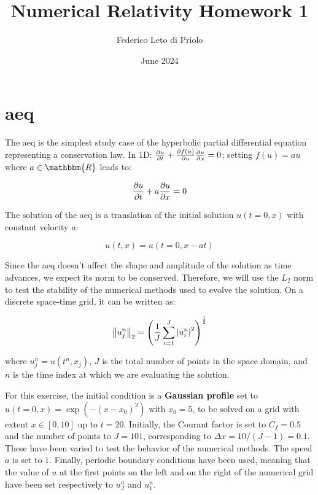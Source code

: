 \documentclass[11pt, a4paper]{article}
\title{Numerical Relativity Homework 1}
\author{Federico Leto di Priolo}
\date{June 2024}
\begin{document}
\maketitle

\section{\acrfull{aeq}}

The \acrshort{aeq} is the simplest study case of the hyperbolic partial differential equation representing a conservation law. In 1D: \(\pdv{u}{t} + \pdv{f(u)}{u} \pdv{u}{x} = 0\); setting \(f(u) = au\) where \(a \in \mathbbm{R}\) leads to:

\begin{equation} \label{eq:adv_eq}
    \pdv{u}{t} + a \pdv{u}{x} = 0
\end{equation}

\noindent
The solution of the \acrshort{aeq} is a translation of the initial solution \(u(t = 0, x)\) with constant velocity \(a\):

\begin{equation} \label{eq:adv_sol}
    u(t, x) = u(t = 0, x - at)
\end{equation}

Since the \acrshort{aeq} doesn't affect the shape and amplitude of the solution as time advances, we expect its norm to be conserved. Therefore, we will use the \(L_2\) norm to test the stability of the numerical methods used to evolve the solution. On a discrete space-time grid, it can be written as:

\begin{equation} \label{eq:l2_norm}
    \norm{u^n_j}_2 = \qty(\frac{1}{J} \sum_{i = 1}^J \abs{u^n_i}^2)^\frac{1}{2}
\end{equation}

\noindent
where \(u^n_j = u(t^n, x_j)\), \(J\) is the total number of points in the space domain, and \(n\) is the time index at which we are evaluating the solution.

For this exercise, the initial condition is a \textbf{Gaussian profile} set to \(u(t = 0, x) = \exp(-(x - x_0)^2)\) with \(x_0 = 5\), to be solved on a grid with extent \(x \in [0, 10]\) up to \(t = 20\). Initially, the Courant factor is set to \(C_f = 0.5\) and the number of points to \(J = 101\), corresponding to \(\Delta x = 10 / (J - 1) = 0.1\). These have been varied to test the behavior of the numerical methods. The speed \(a\) is set to \(1\). Finally, periodic boundary conditions have been used, meaning that the value of \(u\) at the first points on the left and on the right of the numerical grid have been set respectively to \(u^n_J\) and \(u^n_1\).
\end{document}
